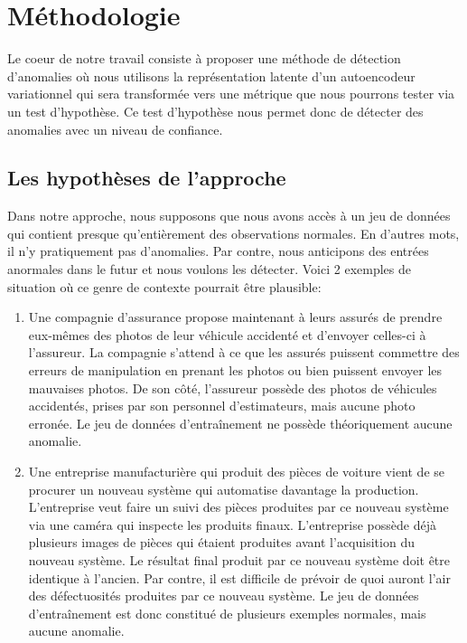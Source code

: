 \chapter{Méthodologie}     %
\label{chap:methodologie}                   %

Le coeur de notre travail consiste à proposer une méthode de détection d'anomalies où nous utilisons la représentation latente d'un autoencodeur variationnel qui sera transformée vers une métrique que nous pourrons tester via un test d'hypothèse. Ce test d'hypothèse nous permet donc de détecter des anomalies avec un niveau de confiance.

\section{Les hypothèses de l'approche}

Dans notre approche, nous supposons que  nous avons accès à un jeu de données qui contient presque qu'entièrement des observations normales. En d'autres mots, il n'y pratiquement pas d'anomalies. Par contre, nous anticipons des entrées anormales dans le futur et nous voulons les détecter. Voici 2 exemples de situation où ce genre de contexte pourrait être plausible:

\begin{enumerate}
	\item Une compagnie d'assurance propose maintenant à leurs assurés de prendre eux-mêmes des photos de leur véhicule accidenté et d'envoyer celles-ci à l'assureur. La compagnie s'attend à ce que les assurés puissent commettre des erreurs de manipulation en prenant les photos ou bien puissent envoyer les mauvaises photos. De son côté, l'assureur possède des photos de véhicules accidentés, prises par son personnel d'estimateurs, mais aucune photo erronée. Le jeu de données d'entraînement ne possède théoriquement aucune anomalie.
	\item Une entreprise manufacturière qui produit des pièces de voiture vient de se procurer un nouveau système qui automatise davantage la production. L'entreprise veut faire un suivi des pièces produites par ce nouveau système via une caméra qui inspecte les produits finaux. L'entreprise possède déjà plusieurs images de pièces qui étaient produites avant l'acquisition du nouveau système. Le résultat final produit par ce nouveau système doit être identique à l'ancien. Par contre, il est difficile de prévoir de quoi auront l'air des défectuosités produites par ce nouveau système. Le jeu de données d'entraînement est donc constitué de plusieurs exemples normales, mais aucune anomalie.
\end{enumerate}

